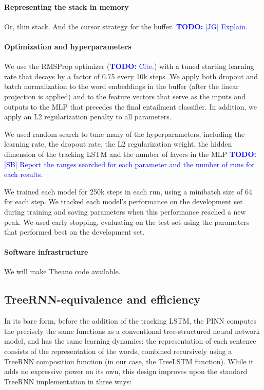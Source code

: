 \documentclass[11pt,letterpaper]{article}
\newcommand\todo[1]{\textcolor{blue}{\textbf{TODO:} #1}}
\begin{document}
\paragraph{Representing the stack in memory} Or, thin stack. And the cursor strategy for the buffer. 
\todo{[JG] Explain.}

\vspace{8em}

\paragraph{Optimization and hyperparameters}

We use the RMSProp optimizer (\todo{Cite.}) with a tuned starting learning rate that decays by a factor of 0.75 every 10k steps. We apply both dropout \cite{srivastava2014dropout} and batch normalization \cite{2015SIoffeCSzegedy} to the word embeddings in the buffer (after the linear projection is applied) and to the feature vectors that serve as the inputs and outputs to the MLP that precedes the final entailment classifier. In addition, we apply an L2 regularization penalty to all parameters.

We used random search to tune many of the hyperparameters, including the learning rate, the dropout rate, the L2 regularization weight, the hidden dimension of the tracking LSTM and the number of layers in the MLP \todo{[SB] Report the ranges searched for each parameter and the number of runs for each results.}

We trained each model for 250k steps in each run, using a minibatch size of 64 for each step. We tracked each model's performance on the development set during training and saving parameters when this performance reached a new peak. We used early stopping, evaluating on the test set using the parameters that performed best on the development set.

\paragraph{Software infrastructure} We will make Theano code available.

\subsection{TreeRNN-equivalence and efficiency}

In its bare form, before the addition of the tracking LSTM, the PINN computes the precisely the same functions as a conventional tree-structured neural network model, and has the same learning dynamics: the representation of each sentence consists of the representation of the words, combined recursively using a TreeRNN composition function (in our case, the TreeLSTM function). While it adds no expressive power on its own, this design improves upon the standard TreeRNN implementation in three ways:
\end{document}
